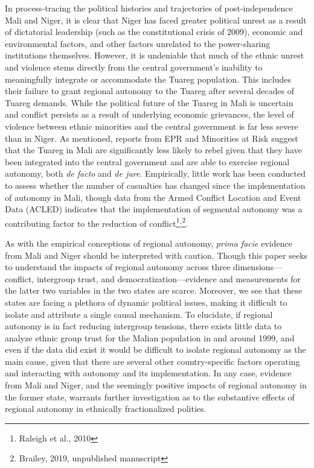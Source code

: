 \documentclass[12pt]{article}
\begin{document}
In process-tracing the political histories and trajectories of post-independence Mali and Niger, it is clear that Niger has faced greater political unrest as a result of dictatorial leadership (such as the constitutional crisis of 2009), economic and environmental factors, and other factors unrelated to the power-sharing institutions themselves. However, it is undeniable that much of the ethnic unrest and violence stems directly from the central government's inability to meaningfully integrate or accommodate the Tuareg population. This includes their failure to grant regional autonomy to the Tuareg after several decades of Tuareg demands. While the political future of the Tuareg in Mali is uncertain and conflict persists as a result of underlying economic grievances, the level of violence between ethnic minorities and the central government is far less severe than in Niger. As mentioned, reports from EPR and Minorities at Risk suggest that the Tuareg in Mali are significantly less likely to rebel given that they have been integrated into the central government and are able to exercise regional autonomy, both \textit{de facto} and \textit{de jure}. Empirically, little work has been conducted to assess whether the number of casualties has changed since the implementation of autonomy in Mali, though data from the Armed Conflict Location and Event Data (ACLED) indicates that the implementation of segmental autonomy was a contributing factor to the reduction of conflict\footnote{Raleigh et al., 2010};\footnote{Brailey, 2019, unpublished manuscript}.

As with the empirical conceptions of regional autonomy, \textit{prima facie} evidence from Mali and Niger should be interpreted with caution. Though this paper seeks to understand the impacts of regional autonomy across three dimensions---conflict, intergroup trust, and democratization---evidence and measurements for the latter two variables in the two states are scarce. Moreover, we see that these states are facing a plethora of dynamic political issues, making it difficult to isolate and attribute a single causal mechanism. To elucidate, if regional autonomy is in fact reducing intergroup tensions, there exists little data to analyze ethnic group trust for the Malian population in and around 1999, and even if the data did exist it would be difficult to isolate regional autonomy as the main cause, given that there are several other country-specific factors operating and interacting with autonomy and its implementation. In any case, evidence from Mali and Niger, and the seemingly positive impacts of regional autonomy in the former state, warrants further investigation as to the substantive effects of regional autonomy in ethnically fractionalized polities. 
\end{document}
